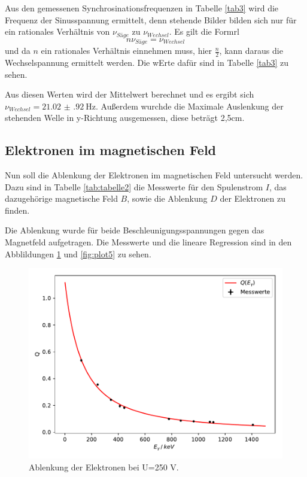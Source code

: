 Aus den gemessenen Synchrosinationsfrequenzen in Tabelle \ref{tab3} wird die Frequenz der
Sinusspannung ermittelt, denn stehende Bilder bilden sich nur für ein rationales Verhältnis
von $\nu_{Säge}$ zu $\nu_{Wechsel}$.
Es gilt die Formrl
\begin{equation}
  n\nu_{Säge}=\nu_{Wechsel}
\end{equation}
und da $n$ ein rationales Verhältnis einnehmen muss, hier $\frac{n}{2}$,
kann daraus die Wechselspannung ermittelt werden. Die wErte dafür sind in Tabelle
\ref{tab3} zu sehen.


Aus diesen Werten wird der Mittelwert berechnet und es ergibt sich
$\nu_{Wechsel}=\SI{21.02(92)}{\Hz}$.
Außerdem wurchde die Maximale Auslenkung der stehenden Welle in y-Richtung ausgemessen, diese
beträgt 2,5\;cm.



\subsection{Elektronen im magnetischen Feld}

Nun soll die Ablenkung der Elektronen im magnetischen Feld untersucht werden.
Dazu sind in Tabelle \ref{tab:tabelle2} die Messwerte für den Spulenstrom $I$, das
dazugehörige magnetische Feld $B$, sowie die Ablenkung $D$ der Elektronen zu finden.



Die Ablenkung wurde für beide Beschleunigungsspannungen gegen das Magnetfeld aufgetragen.
Die Messwerte und die lineare Regression sind in den Abblildungen \ref{fig:plot4} und
\ref{fig:plot5} zu sehen.

\begin{figure}
  \centering
  \includegraphics{plot4.pdf}
  \caption{Ablenkung der Elektronen bei U=250\; V.}
  \label{fig:plot4}
\end{figure}

